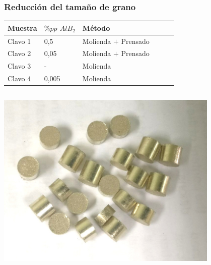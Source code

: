 \documentclass[usenames,dvipsnames]{beamer}
\begin{document}
\begin{frame}
 \frametitle{Reducción del tamaño de grano}

 \begin{center}
 \begin{small}
\begin{tabular}{@{}llllll@{}}  \toprule
Muestra  &   $\% pp$ $AlB_2$ & Método \\ \midrule
Clavo 1  & 0,5               & Molienda $+$ Prensado \\
Clavo 2  & 0,05              & Molienda $+$ Prensado \\
Clavo 3  & -                 & Molienda     \\
Clavo 4  & 0,005             & Molienda     \\
\bottomrule
\end{tabular}
\end{small}
 \end{center}

\hfill
\begin{columns}
\includegraphics[width=0.8\textwidth]{img/proceso/PastMolienda.jpg}


\end{columns}
\end{frame}
\end{document}

